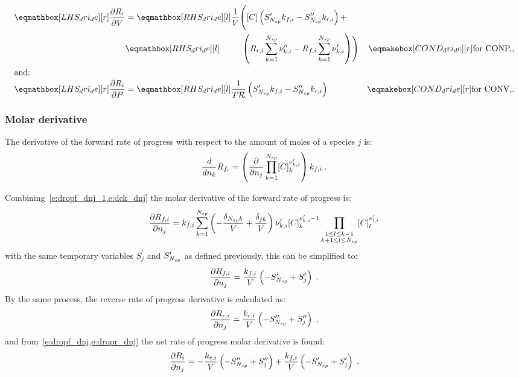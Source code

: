 \documentclass[12pt,number,sort&compress]{elsarticle}
\begin{document}
\begin{subequations}
 \label{e:dropi_de}
 \begin{align}
  \lhs{dri_de}{\frac{\partial {R}_{i} }{\partial V }} &= \rhs{dri_de}{\frac{1}{V}\Biggl( [C]\left(S^{\prime}_{\ns/} {k_{f, i}} - S^{\prime\prime}_{\ns/} {k_{r, i}}\right) + } & \nonumber\\
  & \rhs{dri_de}{\mathindent[farth] \left({R_{r, i}} \sum_{k=1}^{\ns/} \nu^{\prime\prime}_{k,i} - {R_{f, i}} \sum_{k=1}^{\ns/} \nu^{\prime}_{k,i}\right) \Biggr)}&\cond{dri_de}{\dconp/,}\\
  \intertext{and:}
  \lhs{dri_de}{\frac{\partial {R}_{i} }{\partial P }} &= \rhs{dri_de}{\frac{1}{T \Ru/} \left(S^{\prime}_{\ns/} {k_{f, i}} - S^{\prime\prime}_{\ns/} {k_{r, i}}\right)}&\cond{dri_de}{\dconv/.}
 \end{align}
\end{subequations}

\subsubsection{Molar derivative}
\label{s:dri_dnj}
The derivative of the forward rate of progress with respect to the amount of moles of a species $j$ is:
\begin{equation}
 \label{e:dropf_dnj_1}
 \frac{d}{d n_{k}} {R_{f_i}} = \left(\frac{\partial}{\partial n_{j}} \prod_{k=1}^{\ns/} [C]_{k}^{\nu^{\prime}_{k,i}}\right) {k_{f, i}} \;.
\end{equation}

Combining~\cref{e:dropf_dnj_1,e:dck_dnj} the molar derivative of the forward rate of progress is:
\begin{equation}
 \frac{\partial {R_{f, i}} }{\partial {n_j} } = {k_{f, i}} \sum_{k=1}^{\ns/} \left(- \frac{\delta_{\ns/ k}}{V} + \frac{\delta_{j k}}{V}\right) \nu^{\prime}_{k,i} [C]_{k}^{\nu^{\prime}_{k,i} - 1} \prod_{\substack{1 \leq l \leq k - 1\\k + 1 \leq l \leq \ns/}} [C]_{l}^{\nu^{\prime}_{l,i}}
\end{equation}
with the same temporary variables $S^{\prime}_{j}$ and $S^{\prime}_{\ns/}$ as defined previously, this can be simplified to:
\begin{equation}
 \label{e:dropf_dnj}
 \frac{\partial {R_{f, i}} }{\partial {n_j} } = \frac{{k_{f, i}}}{V} \left(- S^{\prime}_{\ns/} + S^{\prime}_{j}\right)\;.
\end{equation}
By the same process, the reverse rate of progress derivative is calculated as:
\begin{equation}
 \label{e:dropr_dnj}
 \frac{\partial {R_{r, i}} }{\partial {n_j} } = \frac{{k_{r, i}}}{V} \left(- S^{\prime\prime}_{\ns/} + S^{\prime\prime}_{j}\right)\;,
\end{equation}
and from~\cref{e:dropf_dnj,e:dropr_dnj} the net rate of progress molar derivative is found:
\begin{equation}
 \label{e:dropi_dnj}
 \frac{\partial R_{i} }{\partial {n_j} } = - \frac{{k_{r, i}}}{V} \left(- S^{\prime\prime}_{\ns/} + S^{\prime\prime}_{j}\right) + \frac{{k_{f, i}}}{V} \left(- S^{\prime}_{\ns/} + S^{\prime}_{j}\right)\;.
\end{equation}
\end{document}
